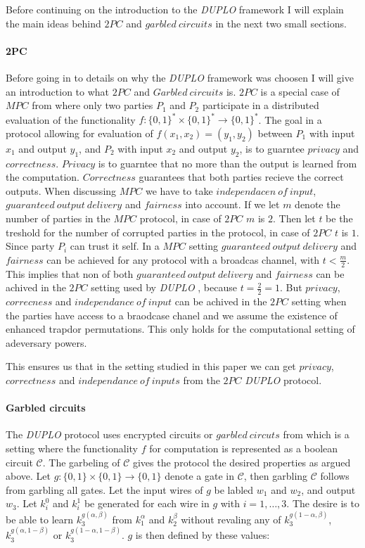 \documentclass[twoside,11pt,openright]{report}
\newcommand{\DUPLO}{\textit{DUPLO} }
\begin{document}
\bigskip

Before continuing on the introduction to the \DUPLO framework I will explain the main ideas behind $2PC$ and $garbled~circuits$ in the next two small sections.

\bigskip

\paragraph{2PC} Before going in to details on why the \DUPLO framework was choosen I will give an introduction to what $2PC$ and $Garbled~circuits$ is. $2PC$ is a special case of $MPC$ from  where only two parties $P_1$ and $P_2$ participate in a distributed evaluation of the functionality $f: \{0,1\}^* \times \{0,1\}^* \to \{0,1\}^*$. The goal in a protocol allowing for evaluation of $f(x_1,x_2)=(y_1,y_2)$ between $P_1$ with input $x_1$ and output $y_1$, and $P_2$ with input $x_2$ and output $y_2$, is to guarntee $privacy$ and $correctness$. $Privacy$ is to guarntee that no more than the output is learned from the computation. $Correctness$ guarantees that both parties recieve the correct outputs. When discussing $MPC$ we have to take $independacen~of~input$, $guaranteed~output~delivery$ and $fairness$ into account. If we let $m$ denote the number of parties in the $MPC$ protocol, in case of $2PC$ $m$ is $2$. Then let $t$ be the treshold for the number of corrupted parties in the protocol, in case of $2PC$ $t$ is $1$. Since party $P_i$ can trust it self. In a $MPC$ setting $guaranteed~output~delivery$ and $fairness$ can be achieved for any protocol with a broadcas channel, with $t<\frac{m}{2}$. This implies that non of both $guaranteed~output~delivery$ and $fairness$ can be achived in the $2PC$ setting used by \DUPLO, because $t=\frac{2}{2}=1$. But $privacy$, $correcness$ and $independance~of~input$ can be achived in the $2PC$ setting when the parties have access to a braodcase chanel and we assume the existence of enhanced trapdor permutations. This only holds for the computational setting of adeversary powers.

This ensures us that in the setting studied in this paper we can get $privacy$, $correctness$ and $independance~of~inputs$ from the $2PC$ \DUPLO protocol.

\paragraph{Garbled circuits} The \DUPLO protocol uses encrypted circuits or $garbled~circuts$ from  which is a setting where the functionality $f$ for computation is represented as a boolean circuit $\mathcal{C}$. The garbeling of $\mathcal{C}$ gives the protocol the desired properties as argued above. Let $g:\{0,1\}\times \{0,1\} \to \{0,1\}$ denote a gate in $\mathcal{C}$, then garbling $\mathcal{C}$ follows from garbling all gates. Let the input wires of $g$ be labled $w_1$ and $w_2$, and output $w_3$. Let $k^0_i$ and $k^1_i$ be generated for each wire in $g$ with $i=1,\dots,3$. The desire is to be able to learn $k^{g(\alpha,\beta)}_3$ from $k^\alpha_1$ and $k^\beta_2$ without revaling any of $k^{g(1-\alpha,\beta)}_3$, $k^{g(\alpha,1-\beta)}_3$ or $k^{g(1-\alpha,1-\beta)}_3$. $g$ is then defined by these values:
\end{document}
